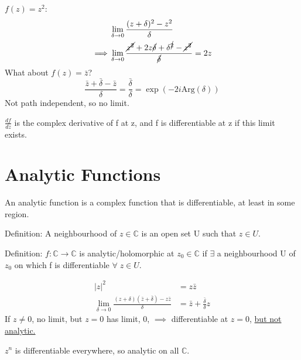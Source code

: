 \documentclass[a4paper, 11pt, normalem]{report}
\newcommand\C{\mathbb{C}}
\begin{document}
\begin{example}
$f(z) = z^2$:
\begin{align}
    & \lim_{\delta\to 0} \frac{(z+\delta)^2 - z^2}{\delta} \\
    \implies & \lim_{\delta\to 0} \frac{\cancel{z^2} + 2z\cancel{\delta} + \delta^{\cancel{2}} - \cancel{z^2}}{\cancel{\delta}} = 2z
\end{align}
What about $f(z) = \bar{z}$?
\begin{equation}
    \frac{\bar{z} + \bar{\delta} - \bar{z}}{\delta} = \frac{\bar{\delta}}{\delta} = \exp{(-2i\mathrm{Arg}(\delta))}
\end{equation}
Not path independent, so no limit. 
\end{example}

$\frac{df}{dz}$ is the complex derivative of f at z, and f is differentiable at z if this limit exists. 

\section{Analytic Functions}
An analytic function is a complex function that is differentiable, at least in some region. 

Definition: A neighbourhood of $z \in \C$ is an open set U such that $z \in U$.

Definition: $f: \C \to \C$ is analytic/holomorphic at $z_0 \in \C$ if $\exists$ a neighbourhood U of $z_0$ on which f is differentiable $\forall \; z \in U$.

\begin{example}
    \begin{align}
        |z|^2 &= z\bar{z} \\
        \lim_{\delta\to 0} \frac{(z+\delta)(\bar{z} + \bar{\delta}) - z\bar{z}}{\delta} &= \bar{z} + \frac{\bar{\delta}}{\delta}z
    \end{align}
If $z \neq 0$, no limit, but $z = 0$ has limit, 0, $\implies$ differentiable at $z = 0$, \underline{but not analytic.}
\end{example}
$z^n$ is differentiable everywhere, so analytic on all $\C$.
\end{document}
